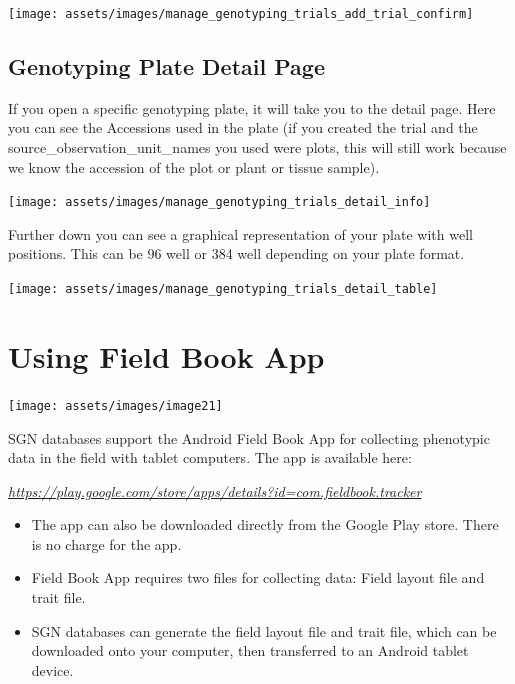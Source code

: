 \documentclass[
  12pt,
]{book}
\begin{document}
\begin{center}\texttt{[image: assets/images/manage\_genotyping\_trials\_add\_trial\_confirm]} \end{center}

\hypertarget{genotyping-plate-detail-page}{%
\section{Genotyping Plate Detail Page}\label{genotyping-plate-detail-page}}

If you open a specific genotyping plate, it will take you to the detail page. Here you can see the Accessions used in the plate (if you created the trial and the source\_observation\_unit\_names you used were plots, this will still work because we know the accession of the plot or plant or tissue sample).

\begin{center}\texttt{[image: assets/images/manage\_genotyping\_trials\_detail\_info]} \end{center}

Further down you can see a graphical representation of your plate with well positions. This can be 96 well or 384 well depending on your plate format.

\begin{center}\texttt{[image: assets/images/manage\_genotyping\_trials\_detail\_table]} \end{center}

\hypertarget{using-fieldbook-app}{%
\chapter{Using Field Book App}\label{using-fieldbook-app}}

\begin{center}\texttt{[image: assets/images/image21]} \end{center}

SGN databases support the Android Field Book App for collecting phenotypic data in the field with tablet computers. The app is available here:

\href{https://play.google.com/store/apps/details?id=com.fieldbook.tracker}{\emph{https://play.google.com/store/apps/details?id=com.fieldbook.tracker}}

\begin{itemize}
\item
  The app can also be downloaded directly from the Google Play store. There is no charge for the app.
\item
  Field Book App requires two files for collecting data: Field layout file and trait file.
\item
  SGN databases can generate the field layout file and trait file, which can be downloaded onto your computer, then transferred to an Android tablet device.
\end{itemize}
\end{document}

